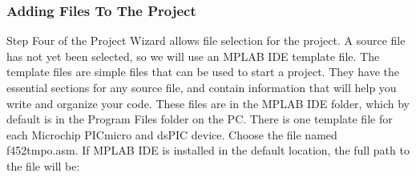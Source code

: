 \documentclass[12pt,a4paper,oneside,openright]{report}
\begin{document}
\subsubsection{Adding Files To The Project}
Step Four of the Project Wizard allows file selection for the project. A source file has not yet been selected, so we will use an MPLAB IDE template file. The template files are simple files that can be used to start a project. They have the essential sections for any source file, and contain information that will help you write and organize your code. These files are in the MPLAB IDE folder, which by default is in the Program Files folder on the PC. There is one template file for each Microchip PICmicro and dsPIC device. Choose the file named f452tmpo.asm. If MPLAB IDE is installed in the default location, the full path to the file will be:
\end{document}
